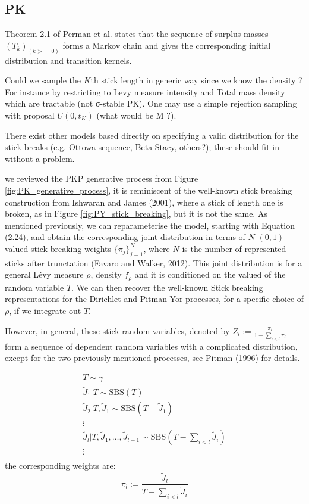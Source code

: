 \subsection{PK}
Theorem 2.1 of Perman et al. states that the sequence of surplus masses $(T_k)_(k>=0)$ forms a Markov chain and gives the corresponding initial distribution and transition kernels.

Could we sample the $K$th stick length in generic way since we know the density ? For instance by restricting to Levy measure intensity and Total mass density which are tractable (not σ-stable PK). One may use a simple rejection sampling with proposal $U(0, t_K)$ (what would be M ?).

There exist other models based directly on specifying a valid distribution for the stick breaks (e.g. Ottowa sequence, Beta-Stacy, others?); these should fit in without a problem.



we reviewed the PKP generative process from Figure \ref{fig:PK_generative_process}, it is reminiscent of the well-known stick breaking construction from Ishwaran and James (2001), where a stick of length one is broken, as in Figure \ref{fig:PY_stick_breaking}, but it is not the same. As mentioned previously, we can reparameterise the model, starting with Equation (2.24), and obtain the corresponding joint distribution in terms of $N$ $(0,1)$-valued stick-breaking weights $\{\pi_j \}_{j=1}^N$, where $N$ is the number of represented sticks after trunctation (Favaro and Walker, 2012). This joint distribution is for a general Lévy measure $\rho$, density $f_\rho$ and it is conditioned on the valued of the random variable $T$. We can then recover the well-known Stick breaking representations for the Dirichlet and Pitman-Yor processes, for a specific choice of $\rho$, if we integrate out $T$.

However, in general, these stick random variables, denoted by $Z_l := \frac{\pi_l}{1 - \sum_{i<l}{\pi_l}}$ form a sequence of dependent random variables with a complicated distribution, except for the two previously mentioned processes, see Pitman (1996) for details.

\begin{gather*}
T \sim \gamma \\
\tilde{J}_1|T \sim \text{SBS}(T) \\
\tilde{J}_2|T,\tilde{J}_1 \sim \text{SBS}(T - \tilde{J}_1) \\
\vdots \\
\tilde{J}_{l}|T,\tilde{J}_1,\dots,\tilde{J}_{l-1} \sim \text{SBS}(T - \sum_{i<l} \tilde{J}_i) \\
\vdots \\
\end{gather*}
the corresponding weights are:
$$ \pi_l := \frac{\tilde{J}_{l}}{T - \sum_{i<l} \tilde{J}_i} $$


